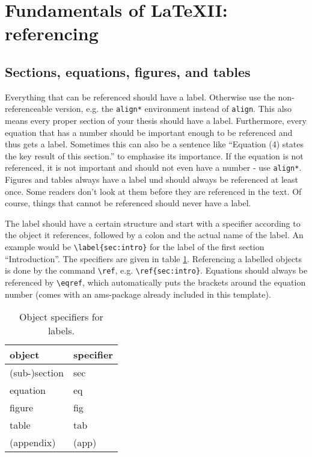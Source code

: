 \documentclass[../main.tex]{subfiles}
\begin{document}
\section{Fundamentals of \LaTeX II: referencing}\label{sec:referencing}

\subsection{Sections, equations, figures, and tables}
\label{sec:refseceq}

Everything that can be referenced should have a label. Otherwise use the
non-referenceable version, e.g. the \verb!align*! environment instead of
\verb!align!. This also means every proper section of your thesis should have a
label. Furthermore, every equation that has a number should be important
enough to be referenced and thus gets a label. Sometimes this can also be a
sentence like ``Equation (4) states the key result of this section.'' to
emphasise its importance. If the equation is not referenced, it is not
important and should not even have a number - use \verb!align*!. Figures and
tables always have a label und should always be referenced at least
once. Some readers don't look at them before they are referenced in the
text. Of course, things that cannot be referenced should
never have a label. 

The label should have a certain structure and start with a specifier
according to the object it references, followed by a colon and the actual name
of the label. An example would be \verb!\label{sec:intro}! for the label of
the first section ``Introduction''. The specifiers are given in table
\ref{tab:labelspec}. Referencing a labelled objects is done by the command
\verb!\ref!, e.g. \verb!\ref{sec:intro}!. Equations should always be
referenced by \verb!\eqref!, which automatically puts the brackets around the
equation number (comes with an ams-package already included in this
template).

\begin{table}[h]
  \centering
  \begin{tabular}{|l|l|}\hline
    \bf object & \bf specifier \\\hline
    (sub-)section & sec\\
    equation & eq\\
    figure & fig\\
    table & tab\\ 
    (appendix) & (app)\\ \hline
  \end{tabular}
  \caption{Object specifiers for labels.}
  \label{tab:labelspec}
\end{table}
\end{document}
